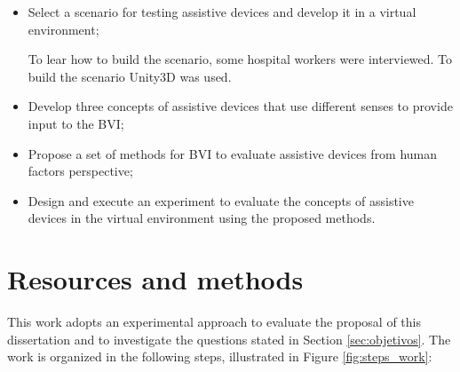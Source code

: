  \begin{itemize}
     \item Select a scenario for testing assistive devices and develop it in a virtual environment; \label{itm:subobj_first}
     
     To lear how to build the scenario, some hospital workers were interviewed. To build the scenario Unity3D was used.

     \item Develop three concepts of assistive devices that use different senses to provide input to the BVI; \label{itm:subobj_second}
     \item Propose a set of methods for BVI to evaluate assistive devices from human factors perspective; \label{itm:subobj_third}
     \item Design and execute an experiment to evaluate the concepts of assistive devices in the virtual environment using the proposed methods. \label{itm:subobj_forth}
 \end{itemize}
 
% 

\section{Resources and methods} 

This work adopts an experimental approach to evaluate the proposal of this dissertation and to investigate the questions stated in Section \ref{sec:objetivos}. 
The work is organized in the following steps, illustrated in Figure \ref{fig:steps_work}:

